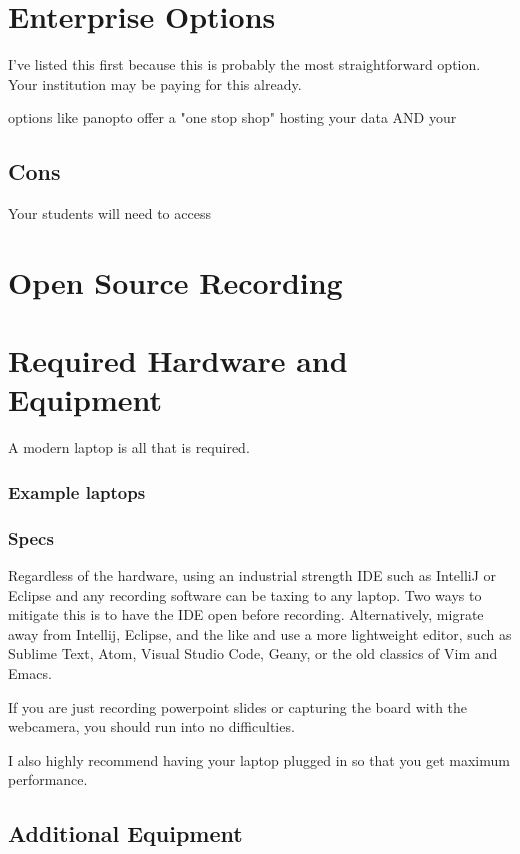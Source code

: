 \documentclass[sigconf]{acmart}
\begin{document}
\section{Enterprise Options}
I've listed this first because this is probably the most straightforward option.
Your institution may be paying for this already.




options like panopto  offer a "one stop shop" hosting your data AND your


\subsection{Cons}
Your students will need to access

\section{Open Source Recording}




\section{Required Hardware and Equipment}
A modern laptop is all that is required.

\subsubsection{Example laptops}
\subsubsection{Specs}

Regardless of the hardware, using an industrial strength IDE such as IntelliJ or Eclipse and any recording software can be taxing to any laptop.
Two ways to mitigate this is to have the IDE open before recording.
Alternatively, migrate away from Intellij, Eclipse, and the like and use a more lightweight editor, such as Sublime Text, Atom, Visual Studio Code, Geany, or the old classics of Vim and Emacs.



If you are just recording powerpoint slides or capturing the board with the webcamera, you should run into no difficulties.

I also highly recommend having your laptop plugged in  so that you get maximum performance.

\subsection{Additional Equipment}
\end{document}
